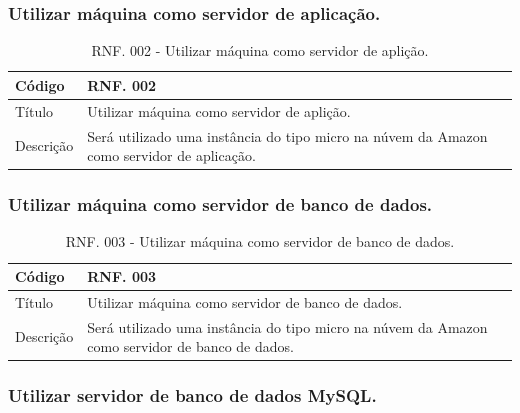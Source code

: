 \documentclass[11pt]{article}
\begin{document}
      \subsubsection{Utilizar máquina como servidor de aplicação.}

        \begin{table}[h]
          \begin{center}
            \begin{tabular}{ | p{5cm} | p{10cm} | }
              \hline
              Código\cellcolor{gray} & RNF. 002\cellcolor{gray} \\
              \hline
              Título & Utilizar máquina como servidor de aplição. \\
              \hline
              Descrição & Será utilizado uma instância do tipo micro na núvem da Amazon como servidor de aplicação. \\
              \hline
            \end{tabular}
            \caption{RNF. 002 - Utilizar máquina como servidor de aplição.}
          \end{center}
        \end{table}

    \clearpage

      \subsubsection{Utilizar máquina como servidor de banco de dados.}

        \begin{table}[h]
          \begin{center}
            \begin{tabular}{ | p{5cm} | p{10cm} | }
              \hline
              Código\cellcolor{gray} & RNF. 003\cellcolor{gray} \\
              \hline
              Título & Utilizar máquina como servidor de banco de dados. \\
              \hline
              Descrição & Será utilizado uma instância do tipo micro na núvem da Amazon como servidor de banco de dados. \\
              \hline
            \end{tabular}
            \caption{RNF. 003 - Utilizar máquina como servidor de banco de dados.}
          \end{center}
        \end{table}

      \subsubsection{Utilizar servidor de banco de dados MySQL.}
\end{document}
